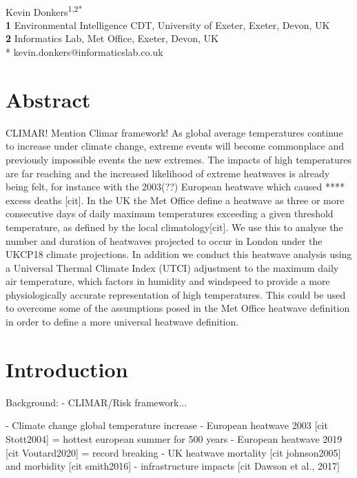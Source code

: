 \documentclass[10pt,letterpaper]{article}
\begin{document}
\vspace*{0.2in}

\begin{flushleft}
{\Large
\textbf{}}
\newline
\\
Kevin Donkers\textsuperscript{1,2*}
\\
\bigskip
\textbf{1} Environmental Intelligence CDT, University of Exeter, Exeter, Devon, UK
\\
\textbf{2} Informatics Lab, Met Office, Exeter, Devon, UK
\\
\bigskip
* kevin.donkers@informaticslab.co.uk
\end{flushleft}


\section*{Abstract}
CLIMAR! Mention Climar framework!
As global average temperatures continue to increase under climate change, extreme events will become commonplace and previously impossible events the new extremes. The impacts of high temperatures  are far reaching and the increased likelihood of extreme heatwaves is already being felt, for instance with the 2003(??) European heatwave which caused **** excess deaths [cit]. In the UK the Met Office define a heatwave as three or more consecutive days of daily maximum temperatures exceeding a given threshold temperature, as defined by the local climatology[cit]. We use this to analyse the number and duration of heatwaves projected to occur in London under the UKCP18 climate projections. In addition we conduct this heatwave analysis using a Universal Thermal Climate Index (UTCI) adjustment to the maximum daily air temperature, which factors in humidity and windspeed to provide a more physiologically accurate representation of high temperatures. This could be used to overcome some of the assumptions posed in the Met Office heatwave definition in order to define a more universal heatwave definition.

\section*{Introduction}

Background:
- CLIMAR/Risk framework...

- Climate change global temperature increase
- European heatwave 2003 [cit Stott2004] = hottest european summer for 500 years
- European heatwave 2019 [cit Voutard2020] = record breaking
- UK heatwave mortality [cit johnson2005] and morbidity [cit smith2016]
- infrastructure impacts [cit Dawson et al., 2017]
\end{document}
